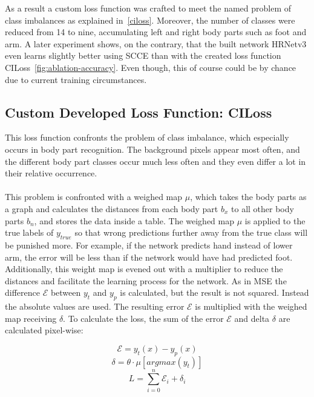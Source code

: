 As a result a custom loss function was crafted to meet the named problem of class imbalances as explained in~\autoref{ciloss}.
Moreover, the number of classes were reduced from 14 to nine, accumulating left and right body parts such as foot and arm.
A later experiment shows, on the contrary, that the built network HRNetv3 even learns slightly better using \gls{SCCE} than with the created
loss function CILoss~\ref{fig:ablation-accuracy}.
Even though, this of course could be by chance due to current training circumstances.


\subsection{Custom Developed Loss Function: CILoss}
\label{ciloss}
This loss function confronts the problem of class imbalance, which especially occurs in body part recognition.
The background pixels appear most often, and the different body part classes occur much less often and they even
differ a lot in their relative occurrence.
\\\mbox{}\\
This problem is confronted with a weighed map $\mu$, which takes the body parts as a graph and calculates
the distances from each body part $b_x$ to all other body parts $b_n$, and stores the data inside a table.
The weighed map $\mu$ is applied to the true labels of $y_{true}$ so that wrong predictions further away from the true
class will be punished more. For example, if the network predicts hand instead of lower arm, the error will be less
than if
the network would have had predicted foot.
Additionally, this weight map is evened out with a multiplier to reduce the distances and facilitate
the learning process for the network.
As in \gls{MSE} the difference $\mathcal{E}$ between $y_t$ and $y_p$ is calculated, but the result is not squared.
Instead the absolute values are used.
The resulting error $\mathcal{E}$ is multiplied with the weighed map receiving $\delta$.
To calculate the loss, the sum of the error $\mathcal{E}$ and delta $\delta$ are calculated pixel-wise:

$$\mathcal{E}=y_t(x)-y_p(x)$$
$$\delta=\theta\cdot\mu[argmax(y_t)] $$
$$L=\sum_{i=0}^{n}\mathcal{E}_i+\delta_i$$



